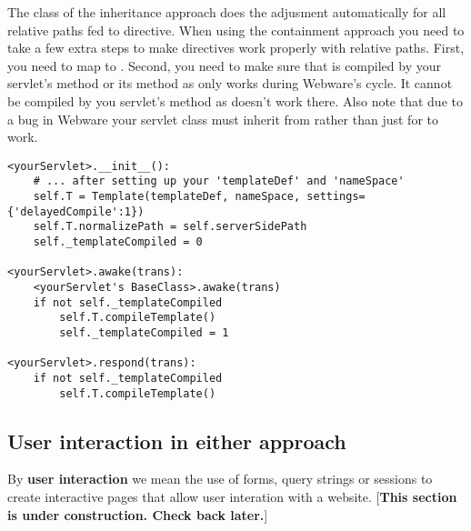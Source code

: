 The  class of the inheritance approach does the adjusment
automatically for all relative paths fed to  directive.  When
using the containment approach you need to take a few extra steps to make
 directives work properly with relative paths. First, you need
to map  to
. Second, you need to make sure that
 is compiled by your servlet's  method or
its  method as  only works during
Webware's  cycle.  It cannot be compiled by you
servlet's  method as  doesn't
work there.  Also note that due to a bug in Webware your servlet class must
inherit from  rather than just  for
 to work.

\begin{verbatim}
<yourServlet>.__init__():
    # ... after setting up your 'templateDef' and 'nameSpace'
    self.T = Template(templateDef, nameSpace, settings={'delayedCompile':1})
    self.T.normalizePath = self.serverSidePath
    self._templateCompiled = 0

<yourServlet>.awake(trans):
    <yourServlet's BaseClass>.awake(trans)
    if not self._templateCompiled
        self.T.compileTemplate()
        self._templateCompiled = 1

<yourServlet>.respond(trans):
    if not self._templateCompiled
        self.T.compileTemplate()
\end{verbatim}


\subsection{User interaction in either approach}
\label{webware.userInteraction}

By {\bf user interaction} we mean the use of forms, query strings or sessions to
create interactive pages that allow user interation with a website.
[{\bf This section is under construction. Check back later.}]


